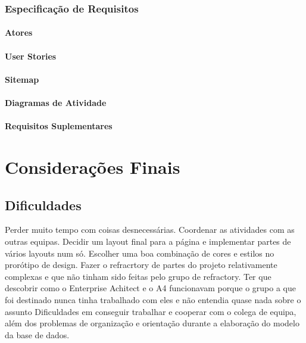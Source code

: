 \documentclass[11pt]{report}
\begin{document}
\subsection{Especificação de Requisitos}

\subsubsection{Atores}

\subsubsection{User Stories}

\subsubsection{Sitemap}

\subsubsection{Diagramas de Atividade}

\subsubsection{Requisitos Suplementares}

\newpage

\chapter{Considerações Finais}

\section{Dificuldades}
Perder muito tempo com coisas desnecessárias.
\linebreak
Coordenar as atividades com as outras equipas. Decidir um layout final para a página e implementar partes de vários layouts num só.
\linebreak
Escolher uma boa combinação de cores e estilos no prorótipo de design.
\linebreak
Fazer o refracrtory de partes do projeto relativamente complexas e que não tinham sido feitas pelo grupo de refractory.
\linebreak
Ter que descobrir como o Enterprise Achitect  e o A4 funcionavam porque o grupo a que foi destinado nunca tinha trabalhado com eles e não entendia quase nada sobre o assunto 
\linebreak
Dificuldades em conseguir trabalhar e cooperar com o colega de equipa, além dos problemas de organização e orientação durante a elaboração do modelo da base de dados.
\end{document}

